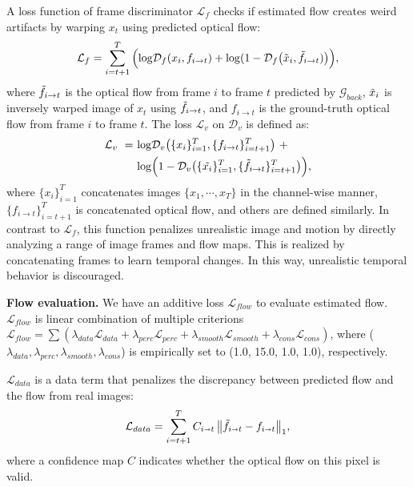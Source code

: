 \documentclass[10pt,twocolumn,letterpaper]{article}
\begin{document}
A loss function of frame discriminator $\mathcal{L}_f$ checks if estimated flow creates weird artifacts by warping $x_t$ using predicted optical flow:
\begin{equation}
    \mathcal{L}_f =\sum_{i=t+1}^{T}\Big(\mathrm{log} \mathcal{D}_f(x_i, f_{i\rightarrow t}) + \mathrm{log}(1 - \mathcal{D}_f\big(\Tilde{x}_{i}, \Tilde{f}_{i\rightarrow t})\big)\Big),
\end{equation}
where $\Tilde{f}_{i\rightarrow t}$ is the optical flow from frame $i$ to frame $t$ predicted by $\mathcal{G}_{back}$, $\Tilde{x}_{i}$ is inversely warped image of $x_t$ using $\Tilde{f}_{i\rightarrow t}$, and $f_{i\rightarrow t}$ is the ground-truth optical flow from frame $i$ to frame $t$. The loss $\mathcal{L}_v$ on $\mathcal{D}_v$ is defined as:
\begin{align}
    \mathcal{L}_v~=~& \mathrm{log}\mathcal{D}_v\big(\{x_i\}_{i=1}^{T}, \{f_{i\rightarrow t}\}_{i=t+1}^{T}\big)~+~\\ \nonumber
    &\mathrm{log}\Big(1- \mathcal{D}_v\big(\{\Tilde{x_i}\}_{i=1}^{T}, \{\Tilde{f}_{i\rightarrow t}\}_{i=t+1}^{T}\big)\Big),
\end{align}
where $\{x_i\}_{i=1}^{T}$ concatenates images $\{x_{1},\cdots,x_{T}\}$ in the channel-wise manner, $\{f_{i\rightarrow t}\}_{i=t+1}^{T}$ is concatenated optical flow, and others are defined similarly.
In contrast to $\mathcal{L}_f$, this function penalizes unrealistic image and motion by directly analyzing a range of image frames and flow maps. This is realized by concatenating frames to learn temporal changes. In this way, unrealistic temporal behavior is discouraged.

\vspace{2mm}
\noindent\textbf{Flow evaluation.}
We have an additive loss $\mathcal{L}_{flow}$ to evaluate estimated flow.
$\mathcal{L}_{flow}$ is linear combination of multiple criterions $\mathcal{L}_{flow} = \sum (\lambda_{data}\mathcal{L}_{data} + \lambda_{perc}\mathcal{L}_{perc} + \lambda_{smooth}\mathcal{L}_{smooth} + \lambda_{cons}\mathcal{L}_{cons})$, where ($\lambda_{data}, \lambda_{perc}, \lambda_{smooth}, \lambda_{cons}$) is empirically set to (1.0, 15.0, 1.0, 1.0), respectively.


$\mathcal{L}_{data}$ is a data term that penalizes the discrepancy between predicted flow and the flow from real images:
\begin{equation}
\mathcal{L}_{data} = \sum_{i=t+1}^{T}{C_{i\shortrightarrow{t}}\left \| \Tilde{f}_{i\shortrightarrow{t}}  - f_{i\shortrightarrow{t}}  \right \|_1},
\end{equation}
where a confidence map $C$ indicates whether the optical flow on this pixel is valid. 
\end{document}
